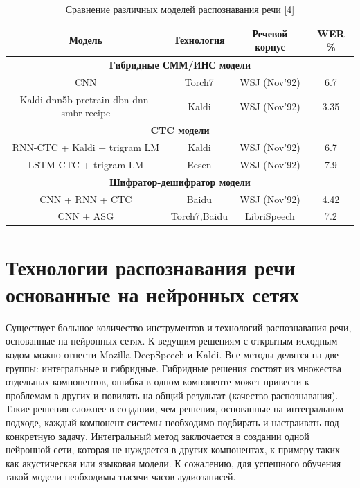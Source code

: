\documentclass[conference]{IEEEtran}
\begin{document}
    \begin{table}[htp]
        \caption{Сравнение различных моделей распознавания речи [4]}
        \begin{center}
            \begin{tabular}{|c|c|c|c|}
                \hline
                Модель & Технология & Речевой корпус & WER \% \\
                \hline
                \multicolumn{4}{|c|}{\textbf{Гибридные СММ/ИНС модели}} \\
                \hline
                CNN & Torch7 & WSJ (Nov’92) & 6.7 \\
                \hline
                Kaldi-dnn5b-pretrain-dbn-dnn-smbr recipe & Kaldi & WSJ (Nov’92) & 3.35 \\
                \hline
                \multicolumn{4}{|c|}{\textbf{CTC модели}} \\
                \hline
                RNN-CTC + Kaldi + trigram LM & Kaldi & WSJ (Nov’92) & 6.7 \\
                \hline
                LSTM-CTC + trigram LM & Eesen & WSJ (Nov’92) & 7.9 \\
                \hline
                \multicolumn{4}{|c|}{\textbf{Шифратор-дешифратор модели}} \\
                \hline
                CNN + RNN + CTC & Baidu & WSJ (Nov’92) & 4.42 \\
                \hline
                CNN + ASG & Torch7,Baidu & LibriSpeech & 7.2 \\
                \hline
            \end{tabular}
            \label{tab1}
        \end{center}
    \end{table}


    \section{Технологии распознавания речи основанные на нейронных сетях}
    Существует большое количество инструментов и технологий распознавания речи, основанные на нейронных сетях.
    К ведущим решениям с открытым исходным кодом можно отнести Mozilla DeepSpeech и Kaldi.
    Все методы делятся на две группы: интегральные и гибридные.
    Гибридные решения состоят из множества отдельных компонентов, ошибка в одном компоненте может привести к проблемам в других и повилять на общий результат (качество распознавания).
    Такие решения сложнее в создании, чем решения, основанные на интегральном подходе, каждый компонент системы необходимо подбирать и настраивать под конкретную задачу.
    Интегральный метод заключается в создании одной нейронной сети, которая не нуждается в других компонентах, к примеру таких как акустическая или языковая модели.
    К сожалению, для успешного обучения такой модели необходимы тысячи часов аудиозаписей.
\end{document}
